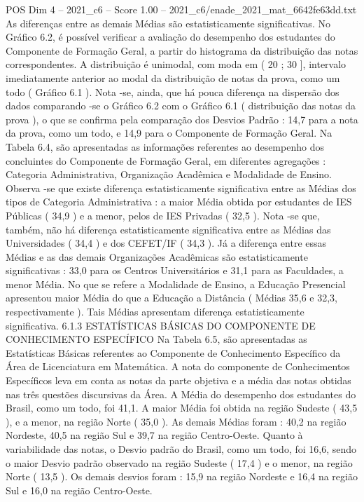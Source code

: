 \begin{textsample}{POS Dim 4 – 2021\_c6 – Score 1.00 – 2021\_c6/enade\_2021\_mat\_6642fe63dd.txt}
As diferenças entre as demais Médias são estatisticamente significativas.
No Gráfico 6.2, é possível verificar a avaliação do desempenho dos estudantes do Componente de Formação Geral, a partir do histograma da distribuição das notas correspondentes.
A distribuição é unimodal, com moda em ( 20 ; 30 ], intervalo imediatamente anterior ao modal da distribuição de notas da prova, como um todo ( Gráfico 6.1 ).
Nota -se, ainda, que há pouca diferença na dispersão dos dados comparando -se o Gráfico 6.2 com o Gráfico 6.1 ( distribuição das notas da prova ), o que se confirma pela comparação dos Desvios Padrão : 14,7 para a nota da prova, como um todo, e 14,9 para o Componente de Formação Geral.
Na Tabela 6.4, são apresentadas as informações referentes ao desempenho dos concluintes do Componente de Formação Geral, em diferentes agregações : Categoria Administrativa, Organização Acadêmica e Modalidade de Ensino.
Observa -se que existe diferença estatisticamente significativa entre as Médias dos tipos de Categoria Administrativa : a maior Média obtida por estudantes de IES Públicas ( 34,9 ) e a menor, pelos de IES Privadas ( 32,5 ).
Nota -se que, também, não há diferença estatisticamente significativa entre as Médias das Universidades ( 34,4 ) e dos CEFET/IF ( 34,3 ).
Já a diferença entre essas Médias e as das demais Organizações Acadêmicas são estatisticamente significativas : 33,0 para os Centros Universitários e 31,1 para as Faculdades, a menor Média.
No que se refere a Modalidade de Ensino, a Educação Presencial apresentou maior Média do que a Educação a Distância ( Médias 35,6 e 32,3, respectivamente ).
Tais Médias apresentam diferença estatisticamente significativa. 6.1.3 ESTATÍSTICAS BÁSICAS DO COMPONENTE DE CONHECIMENTO ESPECÍFICO Na Tabela 6.5, são apresentadas as Estatísticas Básicas referentes ao Componente de Conhecimento Específico da Área de Licenciatura em Matemática.
A nota do componente de Conhecimentos Específicos leva em conta as notas da parte objetiva e a média das notas obtidas nas três questões discursivas da Área.
A Média do desempenho dos estudantes do Brasil, como um todo, foi 41,1.
A maior Média foi obtida na região Sudeste ( 43,5 ), e a menor, na região Norte ( 35,0 ).
As demais Médias foram : 40,2 na região Nordeste, 40,5 na região Sul e 39,7 na região Centro-Oeste.
Quanto à variabilidade das notas, o Desvio padrão do Brasil, como um todo, foi 16,6, sendo o maior Desvio padrão observado na região Sudeste ( 17,4 ) e o menor, na região Norte ( 13,5 ).
Os demais desvios foram : 15,9 na região Nordeste e 16,4 na região Sul e 16,0 na região Centro-Oeste.

\end{textsample}
